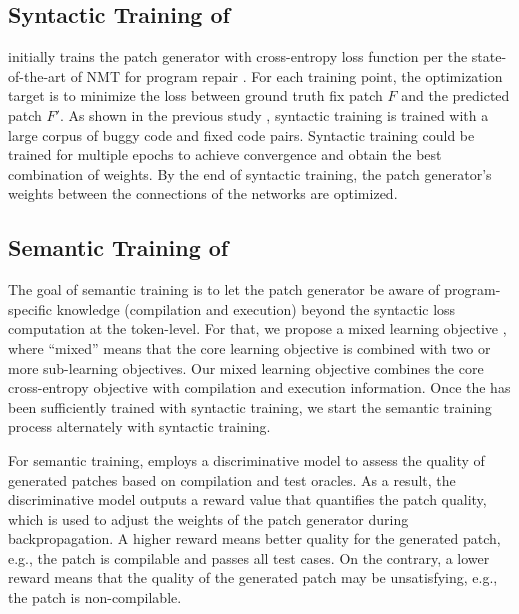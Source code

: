 \subsection{Syntactic Training of \approach}
\label{sec3:syntactic_training}

\approach initially trains the patch generator with cross-entropy loss function per the state-of-the-art of NMT for program repair \cite{CoCoNuT,SEQUENCER,deepfix,DLFix,Tufano-ICSE19,codit-tse20,CURE-icse21}. 
For each training point, the optimization target is to minimize the loss between ground truth fix patch $F$ and the predicted patch $F'$. 
As shown in the previous study \cite{CURE-icse21,CoCoNuT},  syntactic training is trained with a large corpus of buggy code and fixed code pairs.
Syntactic training could be trained for multiple epochs to achieve convergence and obtain the best combination of weights.
By the end of syntactic training, the patch generator's weights between the connections of the networks are optimized.

\subsection{Semantic Training of \approach}
\label{sec-discriminator}
\label{sec:semantic_training}

The goal of semantic training is to let the patch generator be aware of program-specific knowledge (compilation and execution) beyond the syntactic loss computation at the token-level. For that, we propose a mixed learning objective \cite{overcorrection}, where ``mixed'' means that the core learning objective is combined with two or more sub-learning objectives. 
Our  mixed learning objective  combines the core cross-entropy objective with compilation and execution information.
Once the \approach has been sufficiently trained with syntactic training, we start the semantic training process alternately with syntactic training.

For semantic  training,  \approach employs a discriminative model to assess the quality of generated patches based on compilation and test oracles. As a result, the discriminative model outputs a reward value that quantifies the patch quality, which is used to adjust the weights of the patch generator during backpropagation.  
A higher reward means  better quality for the generated patch, e.g., the patch is compilable and passes all test cases.   On the contrary, a lower reward means that the quality of the generated patch may be unsatisfying, e.g., the patch is non-compilable.

